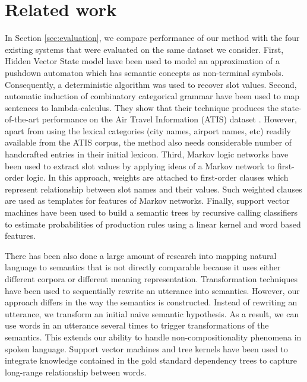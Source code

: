 \documentclass{article}
\begin{document}
\section{Related work}

In Section \ref{sec:evaluation}, we compare performance of our method with the four existing systems that were evaluated on the same dataset we consider. 
First, Hidden Vector State model \cite{he05,jurcicek08} have been used to model an approximation of a pushdown automaton which has semantic concepts as non-terminal symbols. Consequently, a deterministic algorithm was used to recover slot values.
Second, automatic induction of combinatory categorical grammar \cite{zettlemoyer07} have been used to map sentences to lambda-calculus. 
They show that their technique produces the state-of-the-art performance on the Air Travel Information (ATIS) dataset \cite{atis94}. However, apart from using the lexical categories (city names, airport names, etc) readily available from the ATIS corpus, the method also needs considerable number of handcrafted entries in their initial lexicon. 
Third, Markov logic networks \cite{meza08b} have been used to extract slot values by applying ideas of a Markov network to first-order logic. In this approach, weights are attached to first-order clauses which represent relationship between slot names and their values. Such weighted clauses are used as templates for features of Markov networks.
Finally, support vector machines \cite{mairesse09} have been used to build a semantic trees by recursive calling classifiers to estimate probabilities of production rules using a linear kernel and word based features.

There has been also done a large amount of research into mapping natural language to semantics that is not directly comparable because it uses either different corpora or different meaning representation. 
Transformation techniques \cite{kate05} have been used to sequentially rewrite an utterance into semantics. However, our approach differs in the way the semantics is constructed. Instead of rewriting an utterance, we transform an initial naive semantic hypothesis. As a result, we can use words in an utterance several times to trigger transformations of the semantics. This extends our ability to handle non-compositionality phenomena in spoken language.
Support vector machines and tree kernels \cite{kate08} have been used to integrate knowledge contained in the gold standard dependency trees to capture long-range relationship between words. 
\end{document}
